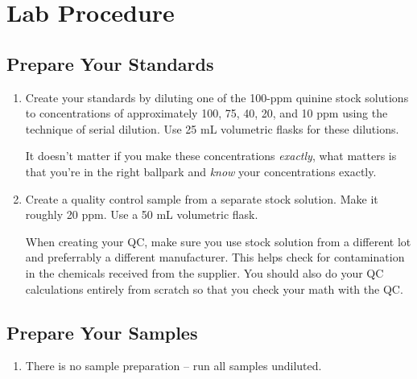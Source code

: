 \documentclass[]{tufte-book}
\providecommand{\tightlist}{%
  \setlength{\itemsep}{0pt}\setlength{\parskip}{0pt}}
\begin{document}
\newpage

\hypertarget{uv-vis-procedure}{%
\section{Lab Procedure}\label{uv-vis-procedure}}

\hypertarget{prepare-your-standards}{%
\subsection{Prepare Your Standards}\label{prepare-your-standards}}

\begin{enumerate}
\def\labelenumi{\arabic{enumi}.}
\item
  Create your standards by diluting one of the 100-ppm quinine stock solutions to concentrations of approximately 100, 75, 40, 20, and 10 ppm using the technique of serial dilution. Use 25 mL volumetric flasks for these dilutions.

  \begin{marginfigure}
   It doesn't matter if you make these concentrations \emph{exactly}, what
   matters is that you're in the right ballpark and \emph{know} your
   concentrations exactly.
   \end{marginfigure}
\item
  Create a quality control sample from a separate stock solution. Make it roughly 20 ppm. Use a 50 mL volumetric flask.

  \begin{marginfigure}
   When creating your QC, make sure you use stock solution from a different
   lot and preferrably a different manufacturer. This helps check for
   contamination in the chemicals received from the supplier. You should
   also do your QC calculations entirely from scratch so that you check
   your math with the QC.
   \end{marginfigure}
\end{enumerate}

\hypertarget{prepare-your-samples}{%
\subsection{Prepare Your Samples}\label{prepare-your-samples}}

\begin{enumerate}
\def\labelenumi{\arabic{enumi}.}
\tightlist
\item
  There is no sample preparation -- run all samples undiluted.
\end{enumerate}
\end{document}
